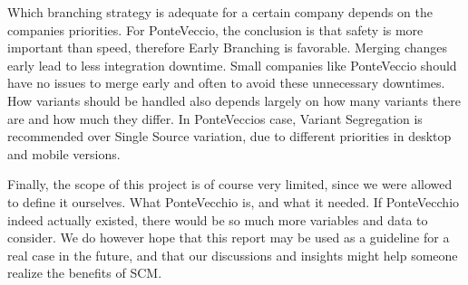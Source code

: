 \documentclass[10pt]{article}
\begin{document}
\noindent Which branching strategy is adequate for a certain company depends on the companies priorities. For PonteVeccio, the conclusion is that safety is more important than speed, therefore Early Branching is favorable. Merging changes early lead to less integration downtime. Small companies like PonteVeccio should have no issues to merge early and often to avoid these unnecessary downtimes. How variants should be handled also depends largely on how many variants there are and how much they differ. In PonteVeccios case, Variant Segregation is recommended over Single Source variation, due to different priorities in desktop and mobile versions.

\noindent Finally, the scope of this project is of course very limited, since we were allowed to define it ourselves. What PonteVecchio is, and what it needed. If PonteVecchio indeed actually existed, there would be so much more variables and data to consider. We do however hope that this report may be used as a guideline for a real case in the future, and that our discussions and insights might help someone realize the benefits of SCM. 
\newpage
{}
\end{document}
